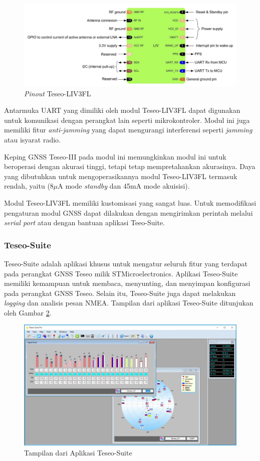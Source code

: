 \begin{figure}[H]
	\centering
	\includegraphics[width=13cm]{contents/chapter-2/teseo_pinout.png}
	\caption{\textit{Pinout} Teseo-LIV3FL \cite{STMicroelectronics2022a}}
	\label{Fig: teseo_pinout}
\end{figure}

Antarmuka UART yang dimiliki oleh modul Teseo-LIV3FL dapat digunakan untuk komunikasi dengan perangkat lain seperti mikrokontroler. Modul ini juga memiliki fitur \textit{anti-jamming} yang dapat mengurangi interferensi seperti \textit{jamming} atau isyarat radio.

Keping GNSS Teseo-III pada modul ini memungkinkan modul ini untuk beroperasi dengan akurasi tinggi, tetapi tetap mempretahankan akurasinya. Daya yang dibutuhkan untuk mengoperasikannya modul Teseo-LIV3FL termasuk rendah, yaitu (8$\mu$A mode \textit{standby} dan 45mA mode akuisisi).

Modul Teseo-LIV3FL memiliki kustomisasi yang sangat luas. Untuk memodifikasi pengaturan modul GNSS dapat dilakukan dengan mengirimkan perintah melalui \textit{serial port} atau dengan bantuan aplikasi Teeo-Suite.

\subsubsection{Teseo-Suite}
Teseo-Suite adalah aplikasi khusus untuk mengatur seluruh fitur yang terdapat pada perangkat GNSS Teseo milik STMicroelectronics. Aplikasi Teseo-Suite memiliki kemampuan untuk membaca, menyunting, dan menyimpan konfigurasi pada perangkat GNSS Teseo. Selain itu, Teseo-Suite juga dapat melakukan \textit{logging} dan analisis pesan NMEA. Tampilan dari aplikasi Teseo-Suite ditunjukan oleh Gambar \ref{Fig: teseo-suite-ss}.

\begin{figure}[ht]
	\centering
	\includegraphics[width=13cm]{contents/chapter-2/teseo-suite.jpeg}
	\caption{Tampilan dari Aplikasi Teseo-Suite}
	\label{Fig: teseo-suite-ss}
\end{figure}

